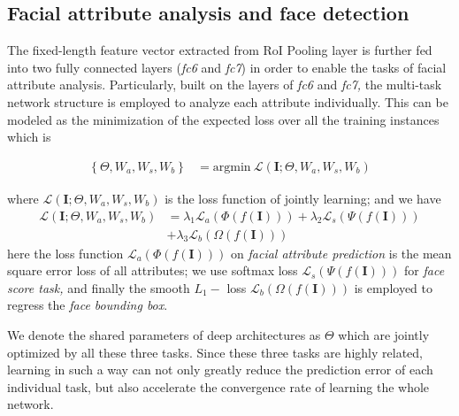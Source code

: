 \documentclass[10pt,twocolumn,letterpaper]{article}
\begin{document}
\subsection{Facial attribute analysis and face detection \label{subsec:Facial-attribute-analysis}}

The fixed-length feature vector extracted from RoI Pooling layer is
further fed into two fully connected layers (\emph{fc6} and \emph{fc7})
in order to enable the tasks of facial attribute analysis. Particularly,
built on the layers of \emph{fc6} and \emph{fc7, }the multi-task network
structure is employed to analyze each attribute individually. This
can be modeled as the minimization of the expected loss over all the
training instances which is

\begin{align}
\left\{ \Theta,W_{a},W_{s},W_{b}\right\}  & =\underset{}{\mathrm{argmin}}\:\mathcal{L}\left(\mathbf{I};\Theta,W_{a},W_{s},W_{b}\right)\label{eq:baseline_model}
\end{align}

\noindent where $\mathcal{L}\left(\mathbf{I};\Theta,W_{a},W_{s},W_{b}\right)$
is the loss function of jointly learning; and we have 
\begin{align}
\mathcal{L}\left(\mathbf{I};\Theta,W_{a},W_{s},W_{b}\right) & =\lambda_{1}\mathcal{L}_{a}\left(\Phi\left(f\left(\mathbf{I}\right)\right)\right)+\lambda_{2}\mathcal{L}_{s}\left(\Psi\left(f\left(\mathbf{I}\right)\right)\right)\label{eq:loss_func_split}\\
 & +\lambda_{3}\mathcal{L}_{b}\left(\Omega\left(f\left(\mathbf{I}\right)\right)\right)\nonumber 
\end{align}
here the loss function $\mathcal{L}_{a}\left(\Phi\left(f\left(\mathbf{I}\right)\right)\right)$
on \emph{facial attribute prediction} is the mean square error loss
of all attributes; we use softmax loss $\mathcal{L}_{s}\left(\Psi\left(f\left(\mathbf{I}\right)\right)\right)$
for \emph{face score task,} and finally the smooth $L_{1}-$ loss
$\mathcal{L}_{b}\left(\Omega\left(f\left(\mathbf{I}\right)\right)\right)$
\cite{fast_rcnn} is employed to regress the \emph{face bounding box}.

\noindent We denote the shared parameters of deep architectures as
$\Theta$ which are jointly optimized by all these three tasks. Since
these three tasks are highly related, learning in such a way can not
only greatly reduce the prediction error of each individual task,
but also accelerate the convergence rate of learning the whole network.
\end{document}
